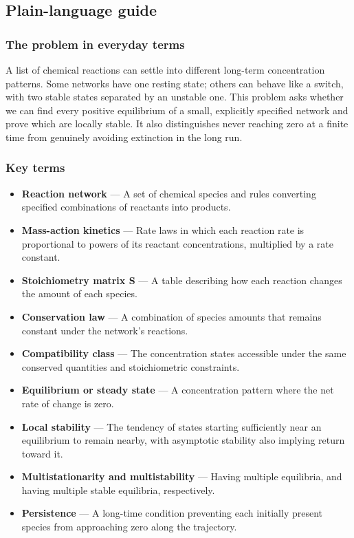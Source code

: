\documentclass[
  11pt,
]{article}
\begin{document}
\subsection{Plain-language guide}

\subsubsection{The problem in everyday terms}

A list of chemical reactions can settle into different long-term
concentration patterns. Some networks have one resting state; others can
behave like a switch, with two stable states separated by an unstable
one. This problem asks whether we can find every positive equilibrium of
a small, explicitly specified network and prove which are locally
stable. It also distinguishes never reaching zero at a finite time from
genuinely avoiding extinction in the long run.

\subsubsection{Key terms}

\begin{itemize}
\item
  \textbf{Reaction network} --- A set of chemical species and rules
  converting specified combinations of reactants into products.
\item
  \textbf{Mass-action kinetics} --- Rate laws in which each reaction
  rate is proportional to powers of its reactant concentrations,
  multiplied by a rate constant.
\item
  \textbf{Stoichiometry matrix S} --- A table describing how each
  reaction changes the amount of each species.
\item
  \textbf{Conservation law} --- A combination of species amounts that
  remains constant under the network's reactions.
\item
  \textbf{Compatibility class} --- The concentration states accessible
  under the same conserved quantities and stoichiometric constraints.
\item
  \textbf{Equilibrium or steady state} --- A concentration pattern where
  the net rate of change is zero.
\item
  \textbf{Local stability} --- The tendency of states starting
  sufficiently near an equilibrium to remain nearby, with asymptotic
  stability also implying return toward it.
\item
  \textbf{Multistationarity and multistability} --- Having multiple
  equilibria, and having multiple stable equilibria, respectively.
\item
  \textbf{Persistence} --- A long-time condition preventing each
  initially present species from approaching zero along the trajectory.
\end{itemize}
\end{document}
